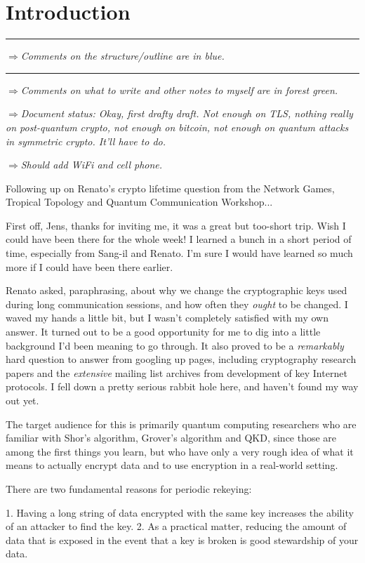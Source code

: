 \documentclass[%
 aip,
 jmp,%
 amsmath,amssymb,
 reprint,%
]{revtex4-1}
\def\outlinecomment#1{\hrule{\color{Blue}$\Rightarrow${\small\em #1}}\hrule}
\def\comment#1{{\color{ForestGreen}$\Rightarrow${\small\em #1}}}
\begin{document}
\section{Introduction}

\outlinecomment{Comments on the structure/outline are in blue.}

\comment{Comments on what to write and other notes to myself are in
  forest green.}

\comment{Document status:
Okay, first drafty draft.  Not enough on TLS,
nothing really on post-quantum crypto, not enough on bitcoin, not
enough on quantum attacks in symmetric crypto.  It'll have to do.}

\comment{Should add WiFi and cell phone.}

Following up on Renato's crypto lifetime question from the Network
Games, Tropical Topology and Quantum Communication Workshop...

First off, Jens, thanks for inviting me, it was a great but too-short
trip.  Wish I could have been there for the whole week!  I learned a
bunch in a short period of time, especially from Sang-il and Renato.
I'm sure I would have learned so much more if I could have been there
earlier.

Renato asked, paraphrasing, about why we change the cryptographic keys
used during long communication sessions, and how often they \emph{ought} to
be changed.  I waved my hands a little bit, but I wasn't completely
satisfied with my own answer.  It turned out to be a good opportunity
for me to dig into a little background I'd been meaning to go through.
It also proved to be a \emph{remarkably} hard question to answer from
googling up pages, including cryptography research papers and the
\emph{extensive} mailing list archives from development of key Internet
protocols.  I fell down a pretty serious rabbit hole here, and haven't
found my way out yet.

The target audience for this is primarily quantum computing
researchers who are familiar with Shor's algorithm, Grover's algorithm
and QKD, since those are among the first things you learn, but who
have only a very rough idea of what it means to actually encrypt data
and to use encryption in a real-world setting.

There are two fundamental reasons for periodic rekeying:

1. Having a long string of data encrypted with the same key increases
the ability of an attacker to find the key.
2. As a practical matter, reducing the amount of data that is exposed
in the event that a key is broken is good stewardship of your data.
\end{document}
